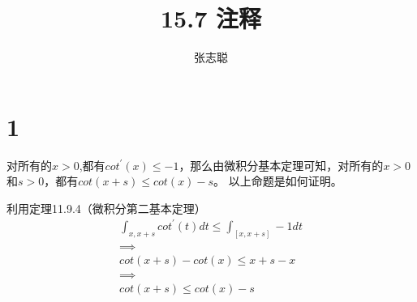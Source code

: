 \documentclass{article}
\begin{document}
\title{15.7 注释}
\author{张志聪}
\maketitle

\section*{1}

\begin{zremark}
  对所有的$x > 0$,都有$cot^\prime(x) \leq -1$，那么由微积分基本定理可知，对所有的$x > 0$和$s > 0$，都有$cot(x + s) \leq cot(x) - s$。
  以上命题是如何证明。
\end{zremark}

利用定理11.9.4（微积分第二基本定理）
\begin{align*}
  \int_{x, x+s} cot^\prime(t) dt \leq \int_{[x, x+s]} -1 dt \\
  \implies                                                  \\
  cot(x + s) - cot(x) \leq x + s - x                        \\
  \implies                                                  \\
  cot(x + s) \leq cot(x) - s
\end{align*}
\end{document}
